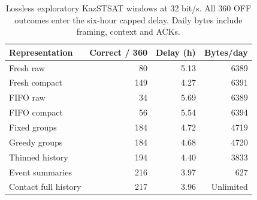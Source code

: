 \begin{table}[!htb]\centering\small
\caption{Lossless exploratory KazSTSAT windows at 32 bit/s. All 360 OFF outcomes enter the six-hour capped delay. Daily bytes include framing, context and ACKs.}\label{tab:explore}
\begin{tabular}{@{}lrrr@{}}\toprule
Representation & Correct / 360 & Delay (h) & Bytes/day\\\midrule
Fresh raw & 80 & 5.13 & 6389\\
Fresh compact & 149 & 4.27 & 6391\\
FIFO raw & 34 & 5.69 & 6389\\
FIFO compact & 56 & 5.54 & 6394\\
Fixed groups & 184 & 4.72 & 4719\\
Greedy groups & 184 & 4.68 & 4720\\
Thinned history & 194 & 4.40 & 3833\\
Event summaries & 216 & 3.97 & 627\\
Contact full history & 217 & 3.96 & Unlimited\\
\bottomrule\end{tabular}\end{table}
